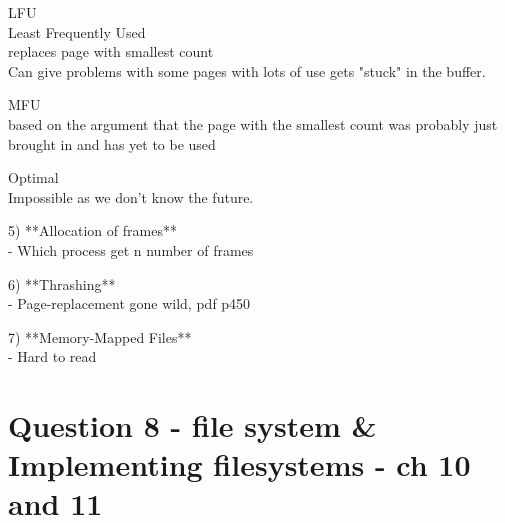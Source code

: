 \documentclass[a4paper,10pt,titlepage]{report}
\begin{document}
\hspace{10mm}LFU \\
\hspace{15mm}Least Frequently Used \\
\hspace{15mm}replaces page with smallest count \\
\hspace{15mm}Can give problems with some pages with lots of use gets "stuck" in the buffer. \\
\vspace{5mm}




\hspace{10mm}MFU \\
\hspace{15mm}based on the argument that the page with the smallest count was probably just brought in and has yet to be used \\
\vspace{5mm}



\hspace{10mm}Optimal \\
 \hspace{15mm}   Impossible as we don't know the future. \\
\vspace{5mm}

\vspace{5mm}

5) **Allocation of frames**  \\
		- Which process get n number of frames \\

\vspace{5mm}

6) **Thrashing** \\
		- Page-replacement gone wild, pdf p450 \\

\vspace{5mm}

7) **Memory-Mapped Files**  \\
		- Hard to read\\












\section{Question 8 - file system \& Implementing filesystems - ch 10 and 11}
\end{document}
